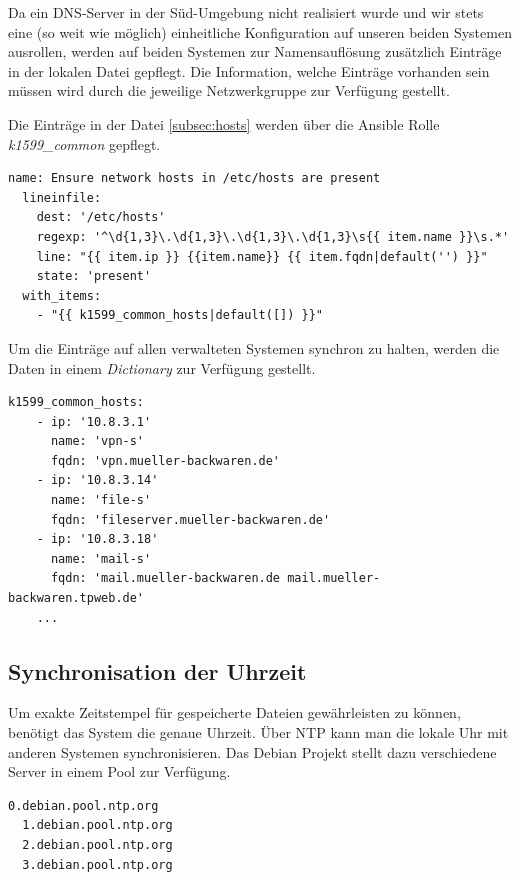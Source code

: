 Da ein DNS-Server in der Süd-Umgebung nicht realisiert wurde und wir stets eine (so weit wie möglich) einheitliche Konfiguration auf unseren beiden Systemen ausrollen, werden auf beiden Systemen zur Namensauflösung zusätzlich Einträge in der lokalen  Datei gepflegt. Die Information, welche Einträge vorhanden sein müssen wird durch die jeweilige Netzwerkgruppe zur Verfügung gestellt.

Die Einträge in der Datei \ref{subsec:hosts} werden über die Ansible Rolle \textit{k1599\_common} gepflegt.

\begin{lstlisting}[label=code:denyany,caption=Auszug aus ansible/roles/k1599\_common/tasks/main.yml]
  name: Ensure network hosts in /etc/hosts are present
  lineinfile:
    dest: '/etc/hosts'
    regexp: '^\d{1,3}\.\d{1,3}\.\d{1,3}\.\d{1,3}\s{{ item.name }}\s.*'
    line: "{{ item.ip }} {{item.name}} {{ item.fqdn|default('') }}"
    state: 'present'
  with_items:
    - "{{ k1599_common_hosts|default([]) }}"
\end{lstlisting}

Um die Einträge auf allen verwalteten Systemen synchron zu halten, werden die Daten in einem \textit{Dictionary} zur Verfügung gestellt.

\begin{lstlisting}[label=code:denyany,caption=Auszug aus ansible/group\_vars/all]
  k1599_common_hosts:
    - ip: '10.8.3.1'
      name: 'vpn-s'
      fqdn: 'vpn.mueller-backwaren.de'
    - ip: '10.8.3.14'
      name: 'file-s'
      fqdn: 'fileserver.mueller-backwaren.de'
    - ip: '10.8.3.18'
      name: 'mail-s'
      fqdn: 'mail.mueller-backwaren.de mail.mueller-backwaren.tpweb.de'
    ...
\end{lstlisting}

\subsection{Synchronisation der Uhrzeit}
Um exakte Zeitstempel für gespeicherte Dateien gewährleisten zu können, benötigt das System die genaue Uhrzeit. Über NTP kann man die lokale Uhr mit anderen Systemen synchronisieren. Das Debian Projekt stellt dazu verschiedene Server in einem Pool zur Verfügung.

\begin{lstlisting}[label=code:ntp,caption=Debian NTP Server]
  0.debian.pool.ntp.org
  1.debian.pool.ntp.org
  2.debian.pool.ntp.org
  3.debian.pool.ntp.org
\end{lstlisting}

